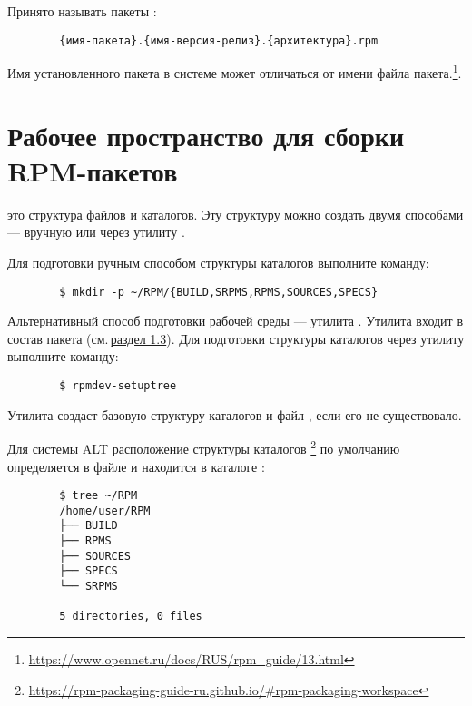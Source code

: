 Принято называть пакеты :
\begin{verbatim}
        {имя-пакета}.{имя-версия-релиз}.{архитектура}.rpm
\end{verbatim}


Имя установленного пакета в системе может отличаться от имени файла пакета.\footnote{\href{https://www.opennet.ru/docs/RUS/rpm_guide/13.html}{https://www.opennet.ru/docs/RUS/rpm\_guide/13.html}}.

\hypertarget{3.4}{\section{Рабочее пространство для сборки RPM-пакетов}}
 это структура файлов и каталогов. Эту структуру
можно создать двумя способами --- вручную или через утилиту .

Для подготовки ручным способом структуры каталогов выполните команду:
\begin{verbatim}
        $ mkdir -p ~/RPM/{BUILD,SRPMS,RPMS,SOURCES,SPECS}
\end{verbatim}

Альтернативный способ подготовки рабочей среды --- утилита . Утилита входит в
состав пакета  (см.\,\hyperlink{1.3}{раздел 1.3}). Для подготовки структуры каталогов
через утилиту  выполните команду:
\begin{verbatim}
        $ rpmdev-setuptree
\end{verbatim}

Утилита создаст базовую структуру каталогов и файл , если его не существовало.

Для системы ALT расположение структуры каталогов%
\footnote{\href{https://rpm-packaging-guide-ru.github.io/\#rpm-packaging-workspace}{https://rpm-packaging-guide-ru.github.io/\#rpm-packaging-workspace}}
 по умолчанию определяется в файле  и находится в каталоге :
\begin{verbatim}
        $ tree ~/RPM
        /home/user/RPM
        ├── BUILD
        ├── RPMS
        ├── SOURCES
        ├── SPECS
        └── SRPMS

        5 directories, 0 files
\end{verbatim}

